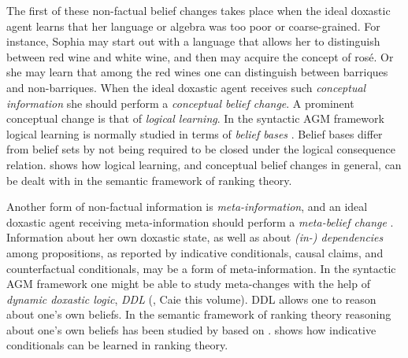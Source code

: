 The first of these non-factual belief changes takes place when the ideal doxastic agent learns that her language or algebra was too poor or coarse-grained. For instance, Sophia may start out with a language that allows her to distinguish between red wine and white wine, and then may acquire the concept of ros\'{e}. Or she may learn that among the red wines one can distinguish between barriques and non-barriques. When the ideal doxastic agent receives such \emph{conceptual information} she should perform a \emph{conceptual belief change}. A prominent conceptual change is that of \emph{logical learning}. In the syntactic AGM framework logical learning is normally studied in terms of \emph{belief bases} \citep{h99}. Belief bases differ from belief sets by not being required to be closed under the logical consequence relation. \citet{h15a} shows how logical learning, and conceptual belief changes in general, can be dealt with in the semantic framework of ranking theory.

Another form of non-factual information is \emph{meta-information}, and an ideal doxastic agent receiving meta-information should perform a \emph{meta-belief change} \citep{s09}. Information about her own doxastic state, as well as about \emph{(in-) dependencies} among propositions, as reported by indicative conditionals, causal claims, and counterfactual conditionals, may be a form of meta-information. In the syntactic AGM framework one might be able to study meta-changes with the help of \emph{dynamic doxastic logic}, \emph{DDL} (\citealt{s95, lr99}, Caie this volume). DDL allows one to reason about one's own beliefs. In the semantic framework of ranking theory reasoning about one's own beliefs has been studied by \citet[chaper 9]{s12} %
 based on \citet{h98}. \citet{h15a} shows how indicative conditionals %
can be learned in ranking theory.

